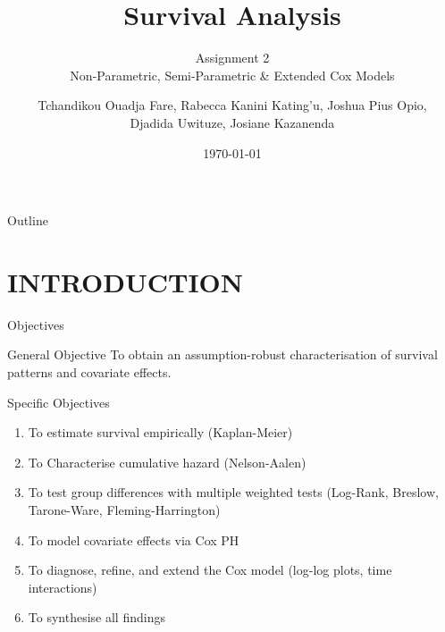 \documentclass[aspectratio=169, 10pt]{beamer}
\title{\textbf{Survival Analysis}}
\subtitle{Assignment 2\\[3pt]
  Non-Parametric, Semi-Parametric \& Extended Cox Models}
\author[Group 2]{%
  \small
  Tchandikou Ouadja Fare, \quad
  Rabecca Kanini Kating'u, \quad
  Joshua Pius Opio, \\[3pt]
  Djadida Uwituze, \quad
  Josiane Kazanenda
}
\date{\scriptsize\today}
\institute{African Institute for Mathematical Sciences (AIMS Rwanda)}
\begin{document}

\begin{frame}
  \titlepage
  \vspace{-10pt}
\end{frame}

\begin{frame}{Outline}
  \tableofcontents[hideallsubsections]
\end{frame}



\begin{frame}
	\begin{center}
		\colorbox{white}{}
	\end{center}
\end{frame}









\section{INTRODUCTION}

\begin{frame}{Objectives}

			\begin{block}{General Objective}
		\large
				To obtain an assumption-robust
				characterisation of survival patterns and covariate effects.
				
			\end{block}
			
			\vspace{6pt}
			\begin{block}{Specific Objectives}
				\begin{enumerate}
					\item To estimate survival empirically (Kaplan-Meier)
					\item To Characterise cumulative hazard (Nelson-Aalen)
					\item To test group differences with \alert{multiple
						weighted tests} (Log-Rank, Breslow,
					Tarone-Ware, Fleming-Harrington)
					\item To model covariate effects via Cox PH
					\item To diagnose, refine, and \alert{extend} the
					Cox model (log-log plots, time interactions)
					\item To synthesise all findings
				\end{enumerate}
			\end{block}

	\end{frame}
	
\end{document}
